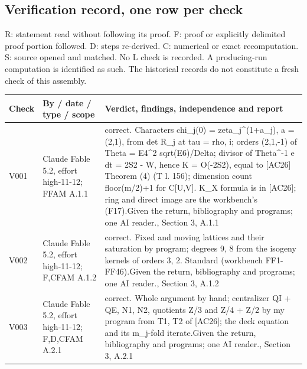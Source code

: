 \subsection{Verification record, one row per check}\label{app:verification}
R: statement read without following its proof. F: proof or explicitly delimited proof portion followed. D: steps re-derived. C: numerical or exact recomputation. S: source opened and matched. No L check is recorded. A producing-run computation is identified as such. The historical records do not constitute a fresh check of this assembly.
\begingroup\footnotesize\setlength{\tabcolsep}{3pt}\begin{longtable}{@{}L{.08\linewidth}L{.31\linewidth}L{.56\linewidth}@{}}
\toprule Check & By / date / type / scope & Verdict, findings, independence and report\\\midrule\endhead
V001 & Claude Fable 5.2, effort high-11-12; F\newline FAM A.1.1 & correct. Characters chi\_\allowbreak{}j(0) = zeta\_\allowbreak{}j\textasciicircum{}(1+a\_\allowbreak{}j), a = (2,1), from det R\_\allowbreak{}j at tau = rho, i; orders (2,1,-1) of Theta = E4\textasciicircum{}2 sqrt(E6)/\allowbreak{}Delta; divisor of Theta\textasciicircum{}-1 e dt = 2S2 - W, hence K = O(-2S2), equal to [AC26] Theorem (4) (T l. 156); dimension count floor(m/\allowbreak{}2)+1 for C[U,V]. K\_\allowbreak{}X formula is in [AC26]; ring and direct image are the workbench's (F17).\newline Given the return, bibliography and programs; one AI reader.\newline {}, Section 3, A.1.1\\
V002 & Claude Fable 5.2, effort high-11-12; F,C\newline FAM A.1.2 & correct. Fixed and moving lattices and their saturation by program; degrees 9, 8 from the isogeny kernels of orders 3, 2. Standard (workbench FF1-FF46).\newline Given the return, bibliography and programs; one AI reader.\newline {}, Section 3, A.1.2\\
V003 & Claude Fable 5.2, effort high-11-12; F,D,C\newline FAM A.2.1 & correct. Whole argument by hand; centralizer QI + QE, N1, N2, quotients Z/\allowbreak{}3 and Z/\allowbreak{}4 + Z/\allowbreak{}2 by my program from T1, T2 of [AC26]; the deck equation and its m\_\allowbreak{}j-fold iterate.\newline Given the return, bibliography and programs; one AI reader.\newline {}, Section 3, A.2.1\\

\end{longtable}
